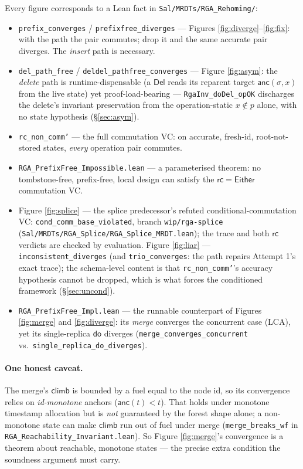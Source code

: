 \documentclass[11pt]{article}
\newcommand{\anc}{\mathsf{anc}}
\newcommand{\climb}{\mathsf{climb}}
\newcommand{\rc}{\mathsf{rc}}
\newcommand{\doo}{\mathsf{do}}
\newcommand{\Del}{\mathsf{Del}}
\newcommand{\Either}{\mathsf{Either}}
\begin{document}
Every figure corresponds to a Lean fact in
\texttt{Sal/MRDTs/RGA\_Rehoming/}:
\begin{itemize}
  \item \texttt{prefix\_converges} / \texttt{prefixfree\_diverges} --- Figures
        \ref{fig:diverge}--\ref{fig:fix}: with the path the pair commutes; drop it
        and the same accurate pair diverges. The \emph{insert} path is necessary.
  \item \texttt{del\_path\_free} / \texttt{deldel\_pathfree\_converges} --- Figure
        \ref{fig:asym}: the \emph{delete} path is runtime-dispensable (a $\Del$ reads
        its reparent target $\anc(\sigma,x)$ from the live state) yet
        proof-load-bearing --- \texttt{RgaInv\_doDel\_opOK} discharges the delete's
        invariant preservation from the operation-static $x\notin p$ alone, with no
        state hypothesis (\S\ref{sec:asym}).
  \item \texttt{rc\_non\_comm'} --- the full commutation VC: on accurate,
        fresh-id, root-not-stored states, \emph{every} operation pair commutes.
  \item \texttt{RGA\_PrefixFree\_Impossible.lean} --- a parameterised theorem: no
        tombstone-free, prefix-free, local design can satisfy the $\rc=\Either$
        commutation VC.
  \item Figure \ref{fig:splice} --- the splice predecessor's refuted
        conditional-commutation VC: \texttt{cond\_comm\_base\_violated}, branch
        \texttt{wip/rga-splice}
        (\texttt{Sal/MRDTs/RGA\_Splice/RGA\_Splice\_MRDT.lean}); the trace and
        both $\rc$ verdicts are checked by evaluation. Figure
        \ref{fig:liar} --- \texttt{inconsistent\_diverges} (and
        \texttt{trio\_converges}: the path repairs Attempt 1's exact trace);
        the schema-level content is that \texttt{rc\_non\_comm'}'s accuracy
        hypothesis cannot be dropped, which is what forces the conditioned
        framework (\S\ref{sec:uncond}).
  \item \texttt{RGA\_PrefixFree\_Impl.lean} --- the runnable counterpart of
        Figures \ref{fig:merge} and \ref{fig:diverge}: its \emph{merge} converges
        the concurrent case (LCA), yet its single-replica $\doo$ diverges
        (\texttt{merge\_converges\_concurrent} vs.\
        \texttt{single\_replica\_do\_diverges}).
\end{itemize}

\paragraph{One honest caveat.} The merge's $\climb$ is bounded by a fuel equal to
the node id, so its convergence relies on \emph{id-monotone} anchors
($\anc(t) < t$). That holds under monotone timestamp allocation but is \emph{not}
guaranteed by the forest shape alone; a non-monotone state can make $\climb$ run
out of fuel under merge (\texttt{merge\_breaks\_wf} in
\texttt{RGA\_Reachability\_Invariant.lean}). So Figure \ref{fig:merge}'s
convergence is a theorem about reachable, monotone states --- the precise extra
condition the soundness argument must carry.
\end{document}
